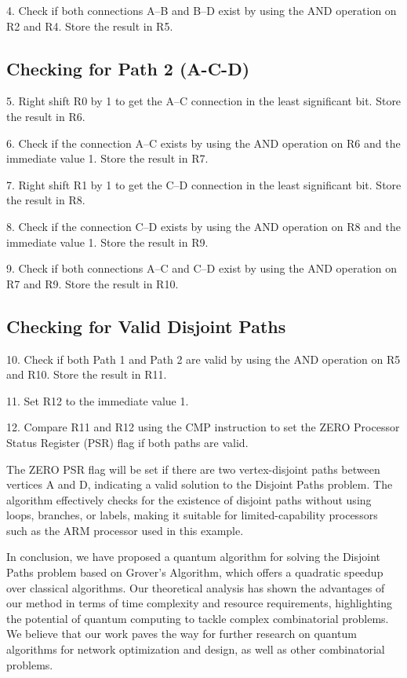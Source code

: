 4. Check if both connections A--B and B--D exist by using the AND operation on R2 and R4. Store the result in R5.

\subsection{Checking for Path 2 (A-C-D)}

5. Right shift R0 by 1 to get the A--C connection in the least significant bit. Store the result in R6.

6. Check if the connection A--C exists by using the AND operation on R6 and the immediate value 1. Store the result in R7.

7. Right shift R1 by 1 to get the C--D connection in the least significant bit. Store the result in R8.

8. Check if the connection C--D exists by using the AND operation on R8 and the immediate value 1. Store the result in R9.

9. Check if both connections A--C and C--D exist by using the AND operation on R7 and R9. Store the result in R10.

\subsection{Checking for Valid Disjoint Paths}

10. Check if both Path 1 and Path 2 are valid by using the AND operation on R5 and R10. Store the result in R11.

11. Set R12 to the immediate value 1.

12. Compare R11 and R12 using the CMP instruction to set the ZERO Processor Status Register (PSR) flag if both paths are valid.

The ZERO PSR flag will be set if there are two vertex-disjoint paths between vertices A and D, indicating a valid solution to the Disjoint Paths problem. The algorithm effectively checks for the existence of disjoint paths without using loops, branches, or labels, making it suitable for limited-capability processors such as the ARM processor used in this example.

In conclusion, we have proposed a quantum algorithm for solving the Disjoint Paths problem based on Grover's Algorithm, which offers a quadratic speedup over classical algorithms. Our theoretical analysis has shown the advantages of our method in terms of time complexity and resource requirements, highlighting the potential of quantum computing to tackle complex combinatorial problems. We believe that our work paves the way for further research on quantum algorithms for network optimization and design, as well as other combinatorial problems.

